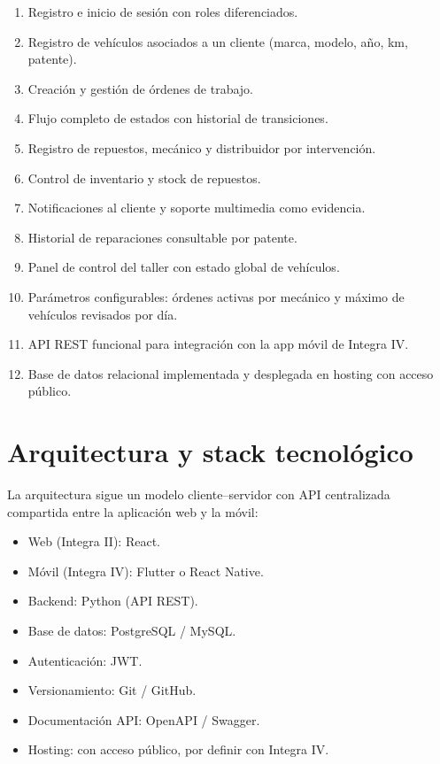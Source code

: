 \documentclass[11pt]{article}
\begin{document}
\begin{enumerate}
  \item Registro e inicio de sesión con roles diferenciados.
  \item Registro de vehículos asociados a un cliente (marca, modelo, año, km, patente).
  \item Creación y gestión de órdenes de trabajo.
  \item Flujo completo de estados con historial de transiciones.
  \item Registro de repuestos, mecánico y distribuidor por intervención.
  \item Control de inventario y stock de repuestos.
  \item Notificaciones al cliente y soporte multimedia como evidencia.
  \item Historial de reparaciones consultable por patente.
  \item Panel de control del taller con estado global de vehículos.
  \item Parámetros configurables: órdenes activas por mecánico y máximo de vehículos revisados por día.
  \item API REST funcional para integración con la app móvil de Integra IV.
  \item Base de datos relacional implementada y desplegada en hosting con acceso público.
\end{enumerate}

\section{Arquitectura y stack tecnológico}

La arquitectura sigue un modelo cliente–servidor con API centralizada compartida entre la aplicación web y la móvil:

\begin{itemize}
  \item Web (Integra II): React.
  \item Móvil (Integra IV): Flutter o React Native.
  \item Backend: Python (API REST).
  \item Base de datos: PostgreSQL / MySQL.
  \item Autenticación: JWT.
  \item Versionamiento: Git / GitHub.
  \item Documentación API: OpenAPI / Swagger.
  \item Hosting: con acceso público, por definir con Integra IV.
\end{itemize}
\end{document}
